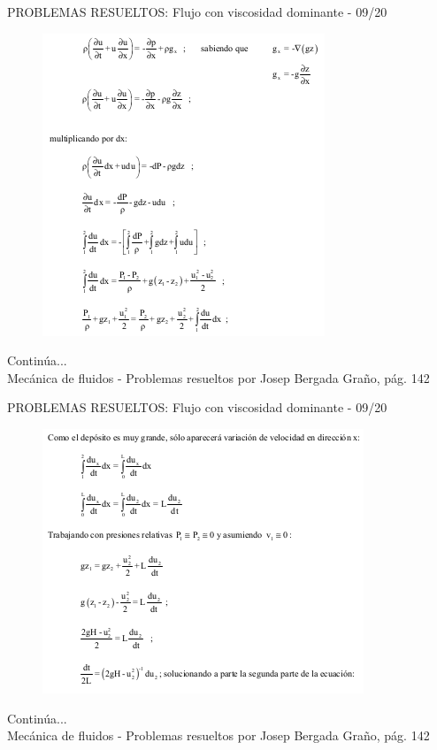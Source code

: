 \begin{frame}{PROBLEMAS RESUELTOS: Flujo con viscosidad dominante - 09/20}
\justifying
\begin{figure}[H]
\centering
\includegraphics[scale=0.5]{Section_Files/S2-imagenes-Jhon/Book-ProbResuelts/P38-E03.png}
\end{figure}
Continúa...\\
{\tiny Mecánica de fluidos - Problemas resueltos por Josep Bergada Graño, pág. 142}
\end{frame}

\begin{frame}{PROBLEMAS RESUELTOS: Flujo con viscosidad dominante - 09/20}
\justifying
\begin{figure}[H]
\centering
\includegraphics[scale=0.5]{Section_Files/S2-imagenes-Jhon/Book-ProbResuelts/P38-E04.png}
\end{figure}
Continúa...\\
{\tiny Mecánica de fluidos - Problemas resueltos por Josep Bergada Graño, pág. 142}
\end{frame}

